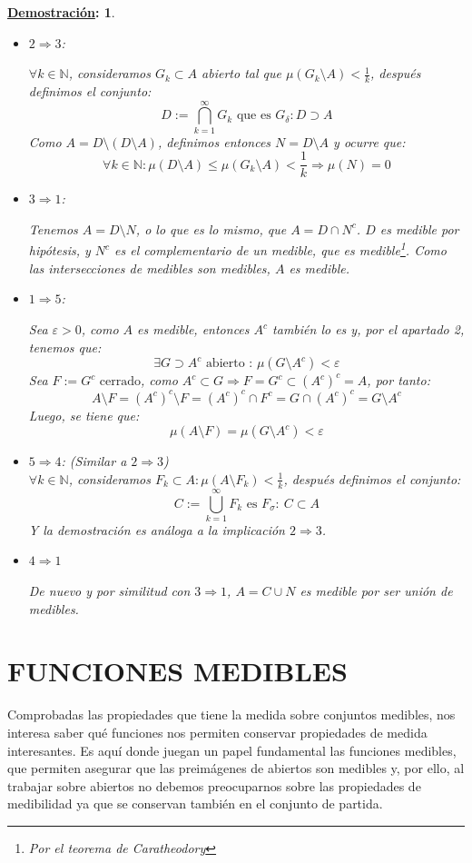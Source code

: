 \documentclass[10pt,a4paper,openright]{book}
\theoremstyle{break}
\newtheorem*{demo}{\underline{Demostración}:}
\begin{document}
\begin{demo}
\begin{itemize}
\item $2 \Rightarrow 3$:

$\forall k \in \mathbb{N}$, consideramos $G_k \subset A$ abierto tal que $\mu\left( G_k \setminus A \right) < \frac{1}{k}$, después definimos el conjunto:
$$D := \bigcap_{k=1}^{\infty}G_k \text{ que es } G_{\delta}:D \supset A$$ 
Como $A = D \setminus (D \setminus A)$, definimos entonces $N = D \setminus A$ y ocurre que:
$$\forall k \in \mathbb{N}: \mu\left( D \setminus A \right) \le \mu\left( G_k \setminus A \right) < \frac{1}{k} \Rightarrow \mu\left( N \right) = 0$$

\item $3 \Rightarrow 1$:

Tenemos $A = D \setminus N$, o lo que es lo mismo, que $A = D \cap N^c$. $D$ es medible por hipótesis, y $N^c$ es el complementario de un medible, que es medible\footnote{Por el teorema de Caratheodory}. Como las intersecciones de medibles son medibles, $A$ es medible.

\item $1 \Rightarrow 5$:

Sea $\varepsilon > 0$, como $A$ es medible, entonces $A^c$ también lo es y, por el apartado 2, tenemos que:
$$\exists G \supset A^c \text{ abierto : } \mu\left( G \setminus A^c \right) < \varepsilon$$ 
Sea $F := G^c \text{ cerrado}$, como  $A^c \subset G \Rightarrow F = G^c \subset \left( A^c \right)^c = A$, por tanto:
$$A \setminus F = \left( A^c \right)^c \setminus F  =\left( A^c \right)^c \cap F^c = G \cap \left( A^c \right)^c = G \setminus A^c$$
Luego, se tiene que:
$$\mu\left( A \setminus F \right) = \mu\left( G \setminus A^c \right) < \varepsilon$$

\item $5 \Rightarrow 4$: (Similar a $2 \Rightarrow 3$)\\
$\forall k \in \mathbb{N}$, consideramos $F_k \subset A : \mu\left( A \setminus F_k \right) < \frac{1}{k}$, después definimos el conjunto:
$$C := \bigcup_{k = 1}^{\infty}F_k  \text{ es } F_{\sigma} : \ C \subset A$$ 
Y la demostración es análoga a la implicación $2 \Rightarrow 3$.

\item $4 \Rightarrow 1$

De nuevo y por similitud con $3\Rightarrow 1$, $A = C \cup N$ es medible por ser unión de medibles.
\end{itemize}
\end{demo}
\section*{FUNCIONES MEDIBLES}%
Comprobadas las propiedades que tiene la medida sobre conjuntos medibles, nos interesa saber qué funciones nos permiten conservar propiedades de medida interesantes. Es aquí donde juegan un papel fundamental las funciones medibles, que permiten asegurar que las preimágenes de abiertos son medibles y, por ello, al trabajar sobre abiertos no debemos preocuparnos sobre las propiedades de medibilidad ya que se conservan también en el conjunto de partida.
 
\end{document}
